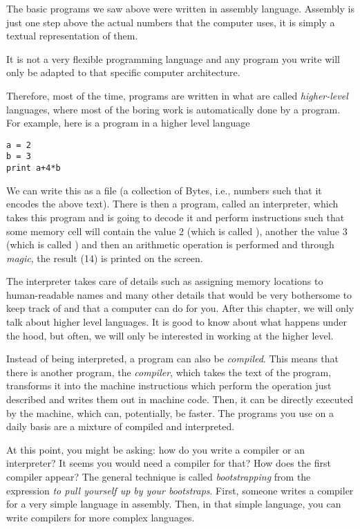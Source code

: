 The basic programs we saw above were written in assembly language. Assembly is
just one step above the actual numbers that the computer uses, it is simply a
textual representation of them.

It is not a very flexible programming language and any program you write will
only be adapted to that specific computer architecture.

Therefore, most of the time, programs are written in what are called
\emph{higher-level} languages, where most of the boring work is automatically
done by a program. For example, here is a program in a higher level language

\begin{verbatim}
a = 2
b = 3
print a+4*b
\end{verbatim}

We can write this as a file (a collection of Bytes, i.e., numbers such that it
encodes the above text). There is then a program, called an interpreter, which
takes this program and is going to decode it and perform instructions such that
some memory cell will contain the value 2 (which is called ), another
the value 3 (which is called ) and then an arithmetic operation is
performed and through \emph{magic}, the result (14) is printed on the screen.

The interpreter takes care of details such as assigning memory locations to
human-readable names and many other details that would be very bothersome to
keep track of and that a computer can do for you. After this chapter, we will
only talk about higher level languages. It is good to know about what happens
under the hood, but often, we will only be interested in working at the higher
level.

Instead of being interpreted, a program can also be \emph{compiled}. This means
that there is another program, the \emph{compiler}, which takes the text of the
program, transforms it into the machine instructions which perform the
operation just described and writes them out in machine code. Then, it can be
directly executed by the machine, which can, potentially, be faster. The
programs you use on a daily basis are a mixture of compiled and interpreted.

At this point, you might be asking: how do you write a compiler or an
interpreter? It seems you would need a compiler for that? How does the first
compiler appear? The general technique is called \emph{bootstrapping} from the
expression \emph{to pull yourself up by your bootstraps}. First, someone writes
a compiler for a very simple language in assembly. Then, in that simple
language, you can write compilers for more complex languages.

